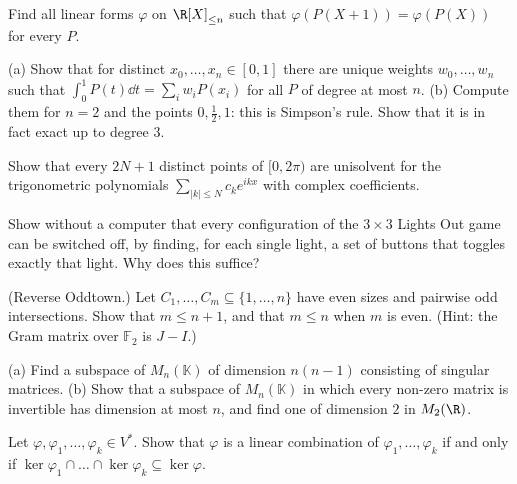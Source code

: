 \begin{exercise}[$\star\star$]\label{linear:ex:shift}
Find all linear forms $\varphi$ on $\R[X]_{\le n}$ such that $\varphi(P(X+1))=\varphi(P(X))$ for every $P$.
\end{exercise}

\begin{exercise}[$\star\star$]\label{linear:ex:quadrature}
(a) Show that for distinct $x_0,\dots,x_n\in[0,1]$ there are unique weights $w_0,\dots,w_n$ such that
$\int_0^1P(t)\dd t=\sum_iw_iP(x_i)$ for all $P$ of degree at most $n$. (b) Compute them for $n=2$ and the points
$0,\frac12,1$: this is Simpson's rule. Show that it is in fact exact up to degree $3$.
\end{exercise}

\begin{exercise}[$\star$]\label{linear:ex:trig}
Show that every $2N+1$ distinct points of $[0,2\pi)$ are unisolvent for the trigonometric polynomials
$\sum_{|k|\le N}c_ke^{ikx}$ with complex coefficients.
\end{exercise}

\begin{exercise}[$\star\star$]\label{linear:ex:lights3}
Show without a computer that every configuration of the $3\times3$ Lights Out game can be switched off, by finding, for
each single light, a set of buttons that toggles exactly that light. Why does this suffice?
\end{exercise}

\begin{exercise}[$\star\star$]\label{linear:ex:eventown}
(Reverse Oddtown.) Let $C_1,\dots,C_m\subseteq\{1,\dots,n\}$ have even sizes and pairwise odd intersections. Show that
$m\le n+1$, and that $m\le n$ when $m$ is even. (Hint: the Gram matrix over $\mathbb F_2$ is $J-I$.)
\end{exercise}

\begin{exercise}[$\star\star$]\label{linear:ex:singularspace}
(a) Find a subspace of $M_n(\mathbb K)$ of dimension $n(n-1)$ consisting of singular matrices. (b) Show that a subspace
of $M_n(\mathbb K)$ in which every non-zero matrix is invertible has dimension at most $n$, and find one of dimension $2$
in $M_2(\R)$.
\end{exercise}

\begin{exercise}[$\star\star$]\label{linear:ex:hyperplanes}
Let $\varphi,\varphi_1,\dots,\varphi_k\in V^*$. Show that $\varphi$ is a linear combination of $\varphi_1,\dots,\varphi_k$ if and only if
$\ker\varphi_1\cap\dots\cap\ker\varphi_k\subseteq\ker\varphi$.
\end{exercise}

